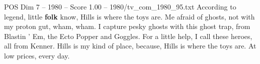 \begin{textsample}{POS Dim 7 – 1980 – Score 1.00 – 1980/tv\_com\_1980\_95.txt}  \label{ex:f7_pos_050}
According to legend, little \textbf{folk} know, Hills is where the toys are.
Me afraid of ghosts, not with my proton gut, wham, wham.
I capture pesky ghosts with this ghost trap, from Blastin ' Em, the Ecto Popper and Goggles.
For a little help, I call these heroes, all from Kenner.
Hills is my kind of place, because, Hills is where the toys are.
At low prices, every day.

\end{textsample}
